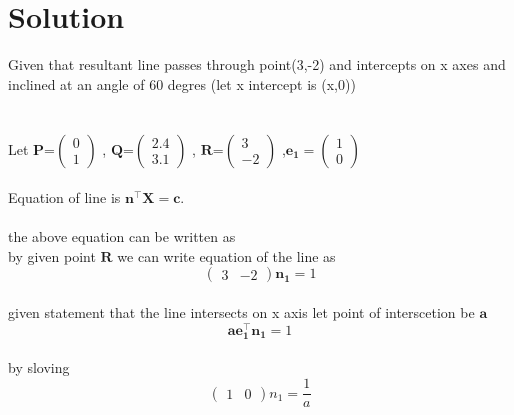 \documentclass[journal,12pt,twocolumn]{article}
\newcommand{\myvec}[1]{\ensuremath{\begin{pmatrix}#1\end{pmatrix}}}
\let\vec\mathbf
\begin{document}
\section{Solution}
Given that resultant line passes through point(3,-2) and intercepts on x axes and inclined at an angle of 60 degres (let x intercept is (x,0)) \\
\\
\\
Let ${\vec{P}}$=$\myvec{
  0\\
  1}$
 , ${\vec{Q}}$=$\myvec{
  2.4\\
  3.1}$
  , ${\vec{R}}$=$\myvec{
  3\\
  -2}$
  ,${\vec{e_1}}=\myvec{1 \\ 0}$
\\
\\
Equation of line is ${\vec{n^{\top}}\vec{X}} = \vec{c}$.\\
\\
the above equation can be written as \center{${\vec{X^{\top}}}\vec{n}=\vec{c}$}\\
 \vspace{0.5cm
 }
 by given point $\vec{R}$ we can write equation of the line as
\begin{equation}
	\myvec{
  3 &
  -2}\vec{n_1}
  = 1 \label{eq-1}
\end{equation}
\\given statement that the line intersects on x axis let point of interscetion be $\vec{a}$
\\
\begin{equation}
\vec{ae_1^{\top}n_1}=1
\end{equation}
\\
by sloving
\begin{equation}
\myvec{1 & 0}n_1=\frac{1}{a}
\end{equation}
\end{document}
